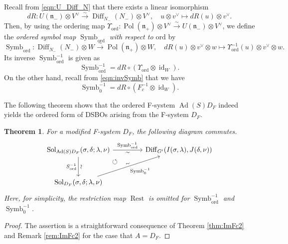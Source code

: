 \documentclass[a4paper,11pt,reqno]{amsart}
\newcommand{\frakn}{\mathfrak{n}}
\newcommand{\0}{{\bf 0}}
\newcommand{\1}{{\bf 1}}
\DeclareMathOperator{\Ad}{Ad}
\DeclareMathOperator{\Pol}{Pol}
\DeclareMathOperator{\id}{id}
\newcommand{\ord}{{\mathrm{ord}}}
\DeclareMathOperator{\Diff}{Diff}
\DeclareMathOperator{\To}{\longrightarrow}
\DeclareMathOperator{\Symb}{Symb}
\DeclareMathOperator{\Rest}{Rest}
\theoremstyle{plain}
\newtheorem{theorem}[equation]{Theorem}
\theoremstyle{definition}
\numberwithin{equation}{section}
\theoremstyle{definition}
\begin{document}
Recall from \eqref{eqn:U_Diff_N} that there exists a linear isomorphism
\begin{equation*}
dR\colon U(\frakn_-)\otimes V^\vee \stackrel{\sim}{\To} 
\Diff_{N_-}(N_-)\otimes V^\vee,
\quad
u \otimes v^\vee\mapsto dR(u) \otimes v^\vee.
\end{equation*} 
Then, by using the ordering map 
$\Upsilon_{\ord}\colon \Pol(\frakn_+)\otimes V^\vee 
\stackrel{\sim}{\to} U(\frakn_-)\otimes V^\vee$,
we define the \emph{ordered symbol map $\Symb_{\ord}$ 
with respect to $\ord$} by 
\begin{equation*}
\Symb_{\ord}\colon 
\Diff_{N_-}(N_-)
\otimes W\stackrel{\sim}{\To} 
\Pol(\frakn_+)\otimes W,
\quad
dR(u)\otimes v^\vee \otimes w 
\longmapsto \Upsilon_{\ord}^{-1}(u) \otimes v^\vee \otimes w.
\end{equation*}
Its inverse $\Symb_{\ord}^{-1}$ is given as 
\begin{equation*}
\Symb_{\ord}^{-1}=dR \circ 
(\Upsilon_{\ord}\otimes \id_{W}) .
\end{equation*}
On the other hand,
recall from \eqref{eqn:invSymb} that we have 
\begin{equation*}
\Symb_0^{-1}=dR\circ (F_c^{-1}\otimes \id_{W}).
\end{equation*}

The following theorem shows that the ordered F-system 
$\Ad(S)D_F$  indeed yields the ordered form of 
DSBOs arising from the F-system $D_F$.

\begin{theorem}\label{thm:symb_ord}
For a modified F-system $D_F$,
the following diagram commutes.
\begin{equation}\label{eqn:RestSymbOrd}
\begin{tikzcd}[row sep=1cm, column sep=1.5cm]
\mathrm{Sol}_{\Ad(S)D_F}(\sigma,\delta;\lambda,\nu)
\arrow[r, "\Symb_{\ord}^{-1}", "\sim"']
\arrow[d, "\sim" sloped,"S^{-1}_\ord"']
&
\Diff_{G'}(I(\sigma,\lambda),J(\delta,\nu))
\\
\mathrm{Sol}_{D_F}(\sigma,\delta;\lambda,\nu)
\arrow[ur,"\sim" sloped, "\Symb_0^{-1}"']
&
\arrow[ul, pos=0.8, phantom, "\circlearrowleft"]
\end{tikzcd}
\end{equation}
Here, for simplicity, the restriction map $\Rest$ is omitted 
for $\Symb_{\ord}^{-1}$ and $\Symb_0^{-1}$.
\end{theorem}

\begin{proof}
The assertion is a straightforward consequence of Theorem \ref{thm:ImFc2}
and Remark \ref{rem:ImFc2} for the case that $A=D_F$.
\end{proof}
\end{document}
